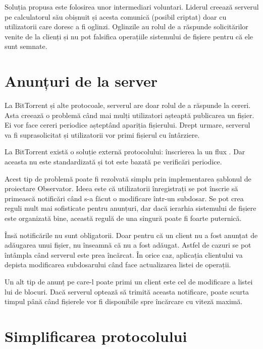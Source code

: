 \documentclass[a4wide,12pt]{report}
\newcommand{\acr}[1]{{\textsmaller[1]{\textsc{#1}}}} %
\begin{document}
Soluția propusa este folosirea unor intermediari voluntari. Liderul creează serverul pe calculatorul său obișnuit și
acesta comunică (posibil criptat) doar cu utilizatorii care doresc a fi oglinzi. Oglinzile au rolul de a răspunde
solicitărilor venite de la clienți și nu pot falsifica operațiile sistemului de fișiere pentru că ele sunt semnate.

\section{Anunțuri de la server} %

La BitTorrent și alte protocoale, serverul are doar rolul de a răspunde la cereri. Asta creează o problemă când mai
mulți utilizatori așteaptă publicarea un fișier. Ei vor face cereri periodice așteptând apariția fișierului. Drept
urmare, serverul va fi suprasolicitat și utilizatorii vor primi fișierul cu întârziere.

La BitTorrent există o soluție externă protocolului: înscrierea la un flux \acr{RSS}. Dar aceasta nu este standardizată
și tot este bazată pe verificări periodice.

Acest tip de problemă poate fi rezolvată simplu prin implementarea șablonul de proiectare Observator. Ideea este că
utilizatorii înregistrați se pot înscrie să primească notificări când s-a făcut o modificare într-un subdosar. Se pot
crea reguli mult mai sofisticate pentru anunțuri, dar dacă ierarhia sistemului de fișiere este organizată bine, această
regulă de una singură poate fi foarte puternică.

Însă notificările nu sunt obligatorii. Doar pentru că un client nu a fost anunțat de adăugarea unui fișier, nu înseamnă
că nu a fost adăugat. Astfel de cazuri se pot întâmpla când serverul este prea încărcat. În orice caz, aplicația
clientului va depista modificarea subdosarului când face actualizarea listei de operații.

Un alt tip de anunț pe care-l poate primi un client este cel de modificare a listei lui de blocuri. Dacă serverul
optează să trimită aceasta notificare, poate scurta timpul până când fișierele vor fi disponibile spre încărcare cu
viteză maximă.

\section{Simplificarea protocolului} %
\end{document}
